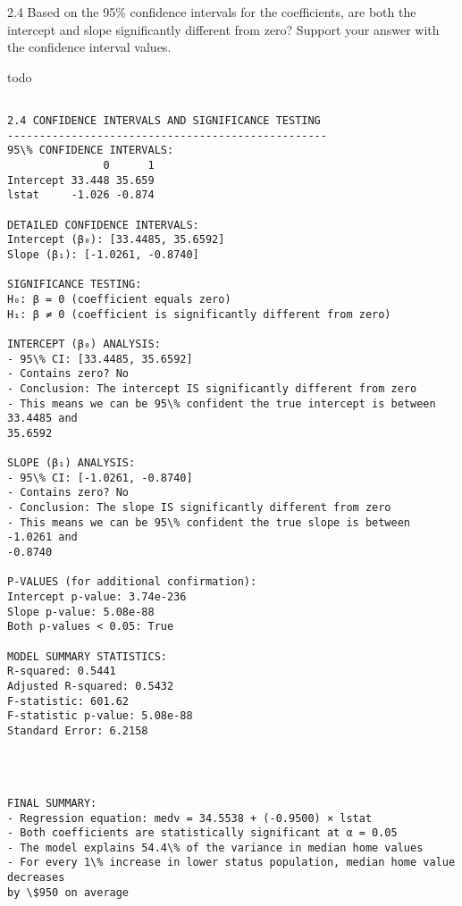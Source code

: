 \documentclass[11pt, twocolumn]{article}
\begin{document}
    2.4 Based on the 95\% confidence intervals for the coefficients, are
both the intercept and slope significantly different from zero? Support
your answer with the confidence interval values.

todo

    \begin{Verbatim}[commandchars=\\\{\}]

2.4 CONFIDENCE INTERVALS AND SIGNIFICANCE TESTING
--------------------------------------------------
95\% CONFIDENCE INTERVALS:
               0      1
Intercept 33.448 35.659
lstat     -1.026 -0.874

DETAILED CONFIDENCE INTERVALS:
Intercept (β₀): [33.4485, 35.6592]
Slope (β₁): [-1.0261, -0.8740]

SIGNIFICANCE TESTING:
H₀: β = 0 (coefficient equals zero)
H₁: β ≠ 0 (coefficient is significantly different from zero)

INTERCEPT (β₀) ANALYSIS:
- 95\% CI: [33.4485, 35.6592]
- Contains zero? No
- Conclusion: The intercept IS significantly different from zero
- This means we can be 95\% confident the true intercept is between 33.4485 and
35.6592

SLOPE (β₁) ANALYSIS:
- 95\% CI: [-1.0261, -0.8740]
- Contains zero? No
- Conclusion: The slope IS significantly different from zero
- This means we can be 95\% confident the true slope is between -1.0261 and
-0.8740

P-VALUES (for additional confirmation):
Intercept p-value: 3.74e-236
Slope p-value: 5.08e-88
Both p-values < 0.05: True

MODEL SUMMARY STATISTICS:
R-squared: 0.5441
Adjusted R-squared: 0.5432
F-statistic: 601.62
F-statistic p-value: 5.08e-88
Standard Error: 6.2158
    \end{Verbatim}

    \begin{center}
    \end{center}
    { \hspace*{\fill} \\}
    
    \begin{Verbatim}[commandchars=\\\{\}]

FINAL SUMMARY:
- Regression equation: medv = 34.5538 + (-0.9500) × lstat
- Both coefficients are statistically significant at α = 0.05
- The model explains 54.4\% of the variance in median home values
- For every 1\% increase in lower status population, median home value decreases
by \$950 on average
    \end{Verbatim}
\end{document}
